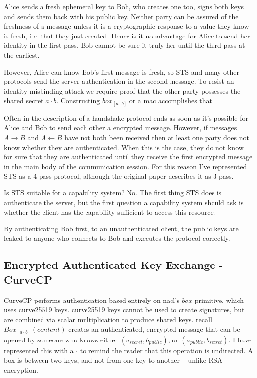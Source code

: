 \documentclass[12pt]{article}
\begin{document}
Alice sends a fresh ephemeral key to Bob, who creates one too,
signs both keys and sends them back with his public key.
Neither party can be assured of the freshness of a message
unless it is a cryptographic response to a value they know is fresh,
i.e. that they just created. Hence is it no advantage for Alice to send
her identity in the first pass, Bob cannot be sure it truly her
until the third pass at the earliest.

However, Alice can know Bob's first message is fresh, so STS and many
other protocols send the server authentication in the second message.
To resist an identity misbinding attack we require proof that the
other party possesses the shared secret $a\cdot b$. Constructing
$box_{[a\cdot b]}$ or a mac accomplishes that \cite[section 3.1]{sigma}

Often in the description of a handshake protocol ends as soon
as it's possible for Alice and Bob to send each other a encrypted
message. However, if messages $A \to B$ and $A \gets B$ have not both
been received then at least one party does not know whether they are
authenticated. When this is the case, they do not know for sure
that they are authenticated until they receive the first encrypted
message in the main body of the communication session. For this reason
I've represented STS as a 4 pass protocol, although the original
paper describes it as 3 pass.

Is STS suitable for a capability system? No. The first thing STS
does is authenticate the server, but the first question a capability
system should ask is whether the client has the capability sufficient
to access this resource.

By authenticating Bob first, to an unauthenticated client, the public
keys are leaked to anyone who connects to Bob and executes the protocol
correctly.

\subsection{Encrypted Authenticated Key Exchange - CurveCP}

CurveCP\cite{curvecp} performs authentication based entirely on
nacl's\cite{nacl} $box$ primitive, which uses curve25519 keys.
curve25519 keys cannot be used to create signatures, but are combined
via scalar multiplication to produce shared keys. recall
$Box_{[a\cdot b]}(content)$ creates an authenticated, encrypted message
that can be opened by someone who knows either $(a_{secret}, b_{public})$,
or $(a_{public}, b_{secret})$. I have represented this with a $\cdot$
to remind the reader that this operation is undirected. A box is between
two keys, and not from one key to another -- unlike RSA encryption.
\end{document}
